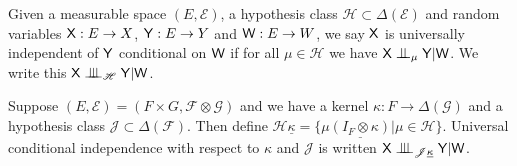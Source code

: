 \begin{definition}\label{def:univ_indep}
Given a measurable space $(E,\mathcal{E})$, a hypothesis class $\mathscr{H}\subset\Delta(\mathcal{E})$ and random variables $\mathsf{X}:E\to X$, $\mathsf{Y}:E\to Y$ and $\mathsf{W}:E\to W$, we say $\mathsf{X}$ is universally independent of $\mathsf{Y}$ conditional on $\mathsf{W}$ if for all $\mu\in\mathscr{H}$ we have $\RV{X}\CI_\mu \RV{Y} | \RV{W}$. We write this $\RV{X} \CII_\mathscr{H} \RV{Y} | \RV{W}$.
\end{definition}

Suppose $(E,\mathcal{E}) = (F\times G, \mathcal{F}\otimes \mathcal{G})$ and we have a kernel $\kappa:F\to \Delta(\mathcal{G})$ and a hypothesis class $\mathscr{J}\subset\Delta(\mathcal{F})$. Then define $\mathscr{H}\underline{\kappa}=\{\mu\underline{(I_F\otimes \kappa)}|\mu\in \mathscr{H}\}$. Universal conditional independence with respect to $\kappa$ and $\mathscr{J}$ is written $\RV{X}\CII_{\mathscr{J}\underline{\kappa}} \RV{Y} | \RV{W}$.